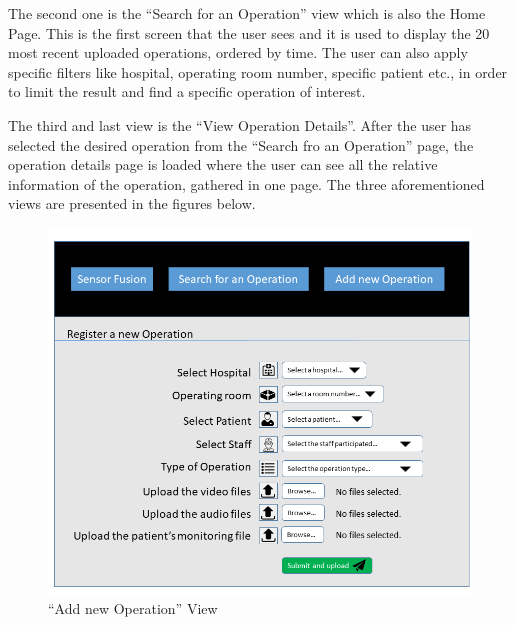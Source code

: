 The second one is the ``Search for an Operation'' view which is also the Home Page. This is the first screen that the user sees and it is used to display the 20 most recent uploaded operations, ordered by time. The user can also apply specific filters like hospital, operating room number, specific patient etc., in order to limit the result and find a specific operation of interest. 

The third and last view is the ``View Operation Details''. After the user has selected the desired operation from the ``Search fro an Operation'' page, the operation details page is loaded where the user can see all the relative information of the operation, gathered in one page. The three	aforementioned views are presented in the figures below.

\begin{figure}[h]
\begin{center}
\includegraphics[width=17cm]{imgs/Add_New_Operation.png}
\end{center}\vspace{-0.3cm}
\caption[``Add new Operation'' View]{``Add new Operation'' View} \label{View-Add}
\end{figure}

